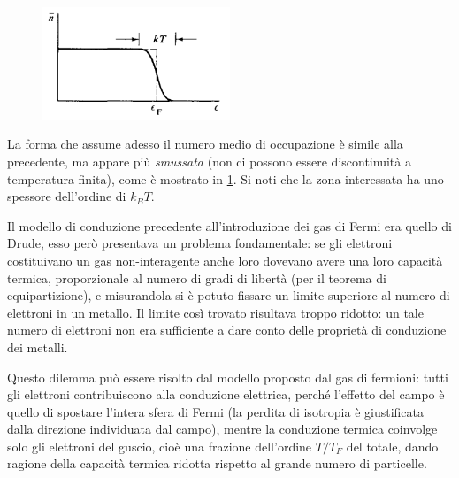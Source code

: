\begin{figure}[h!]
	\centering
	\includegraphics[width=0.5\textwidth]{Immagini/FStepT.png}
	\caption{}
	\label{fig:fstepT}
\end{figure}

La forma che assume adesso il numero medio di occupazione è simile alla precedente, ma appare più \textit{smussata} (non ci possono essere discontinuità a temperatura finita), come è mostrato in \cref{fig:fstepT}. 
Si noti che la zona interessata ha uno spessore dell'ordine di $k_B T$.
\newline

Il modello di conduzione precedente all'introduzione dei gas di Fermi era quello di Drude, esso però presentava un problema fondamentale: se gli elettroni costituivano un gas non-interagente anche loro dovevano avere una loro capacità termica, proporzionale al numero di gradi di libertà (per il teorema di equipartizione), e misurandola si è potuto fissare un limite superiore al numero di elettroni in un metallo. Il limite così trovato risultava troppo ridotto: un tale numero di elettroni non era sufficiente a dare conto delle proprietà di conduzione dei metalli.

Questo dilemma può essere risolto dal modello proposto dal gas di fermioni: tutti gli elettroni contribuiscono alla conduzione elettrica, perché l'effetto del campo è quello di spostare l'intera sfera di Fermi (la perdita di isotropia è giustificata dalla direzione individuata dal campo), mentre la conduzione termica coinvolge solo gli elettroni del guscio, cioè una frazione dell'ordine $T/T_F$ del totale, dando ragione della capacità termica ridotta rispetto al grande numero di particelle.

